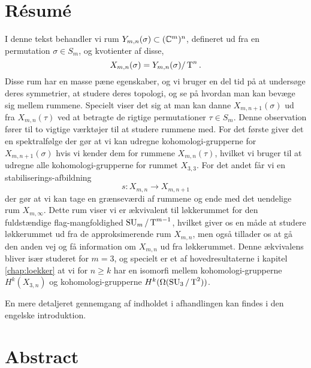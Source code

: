 
\chapter{Résumé} 

I denne tekst behandler vi rum $Y_{m,n}(\sigma)\subset (\mathbb{C}^m)^n$,
defineret ud fra
en permutation $\sigma\in S_m$, og
kvotienter af disse,
\[ X_{m,n}(\sigma) = Y_{m,n}(\sigma) /\operatorname{T}^n. \]
Disse rum har en masse pæne egenskaber, og vi bruger en del tid på at
undersøge deres symmetrier, at studere deres topologi, og se på hvordan
man kan bevæge sig mellem
rummene. Specielt viser det sig at man kan danne $X_{m,n+1}(\sigma)$ ud
fra $X_{m,n}(\tau)$ ved at betragte de rigtige permutationer
$\tau\in S_m$. Denne observation fører til to vigtige værktøjer til at
studere rummene med. For det første giver det en spektralfølge der gør
at vi kan udregne
kohomologi-grupperne for $X_{m,n+1}(\sigma)$ hvis vi kender dem for
rummene $X_{m,n}(\tau)$, hvilket vi bruger til at udregne alle
kohomologi-grupperne for rummet $X_{3,3}$. For det andet får vi en
stabiliserings-afbildning
\[ s : X_{m,n} \to X_{m,n+1} \]
der gør at vi kan tage en grænseværdi af rummene og ende med det
uendelige rum $X_{m,\infty}$. Dette rum viser vi er ækvivalent til
løkkerummet for den fuldstændige flag-mangfoldighed $\operatorname{SU}_{m}/\operatorname{T}^{m-1}$, hvilket
giver os en måde at studere løkkerummet ud fra de approksimerende rum
$X_{m,n}$, men også tillader os at gå den anden vej og få information
om $X_{m,n}$ ud fra løkkerummet. Denne ækvivalens bliver især
studeret for $m = 3$, og specielt er et af hovedresultaterne i
kapitel \ref{chap:loekker} at vi for $n \geq k$ har en isomorfi mellem
kohomologi-grupperne $H^k(X_{3,n})$ og kohomologi-grupperne 
$H^k(\Omega(\operatorname{SU}_3/\operatorname{T}^2))$.

En mere detaljeret gennemgang af indholdet i afhandlingen kan
findes i den engelske introduktion.

\chapter{Abstract}

